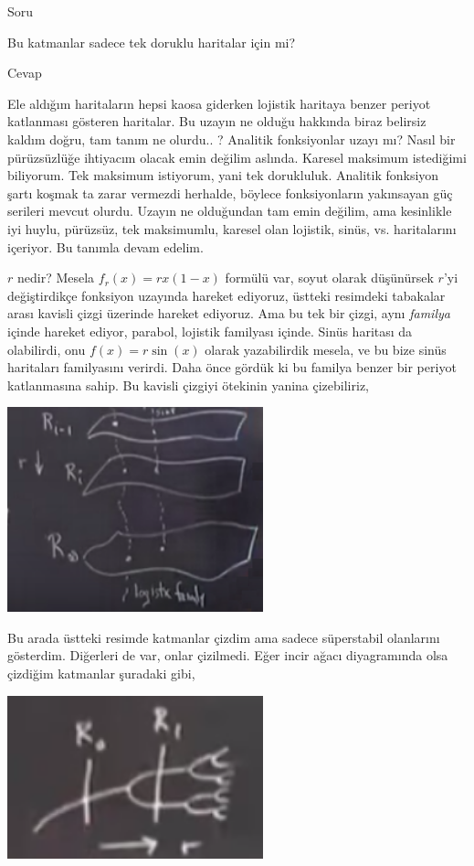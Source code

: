 \documentclass[12pt,fleqn]{article}\usepackage{../../common}
\begin{document}
Soru

Bu katmanlar sadece tek doruklu haritalar için mi?

Cevap

Ele aldığım haritaların hepsi kaosa giderken lojistik haritaya benzer periyot
katlanması gösteren haritalar. Bu uzayın ne olduğu hakkında biraz belirsiz
kaldım doğru, tam tanım ne olurdu.. ? Analitik fonksiyonlar uzayı mı? Nasıl bir
pürüzsüzlüğe ihtiyacım olacak emin değilim aslında. Karesel maksimum istediğimi
biliyorum. Tek maksimum istiyorum, yani tek dorukluluk. Analitik fonksiyon şartı
koşmak ta zarar vermezdi herhalde, böylece fonksiyonların yakınsayan güç
serileri mevcut olurdu. Uzayın ne olduğundan tam emin değilim, ama kesinlikle
iyi huylu, pürüzsüz, tek maksimumlu, karesel olan lojistik, sinüs,
vs. haritalarını içeriyor. Bu tanımla devam edelim.

$r$ nedir? Mesela $f_r(x) = rx(1-x)$ formülü var, soyut olarak düşünürsek $r$'yi
değiştirdikçe fonksiyon uzayında hareket ediyoruz, üstteki resimdeki tabakalar
arası kavisli çizgi üzerinde hareket ediyoruz. Ama bu tek bir çizgi, aynı {\em
  familya} içinde hareket ediyor, parabol, lojistik familyası içinde. Sinüs
haritası da olabilirdi, onu $f(x) = r\sin(x)$ olarak yazabilirdik mesela, ve bu
bize sinüs haritaları familyasını verirdi. Daha önce gördük ki bu familya benzer
bir periyot katlanmasına sahip. Bu kavisli çizgiyi ötekinin yanina çizebiliriz,

\includegraphics[width=20em]{22_04.png}

Bu arada üstteki resimde katmanlar çizdim ama sadece süperstabil olanlarını
gösterdim. Diğerleri de var, onlar çizilmedi. Eğer incir ağacı diyagramında olsa
çizdiğim katmanlar şuradaki gibi,

\includegraphics[width=20em]{22_05.png}
\end{document}
